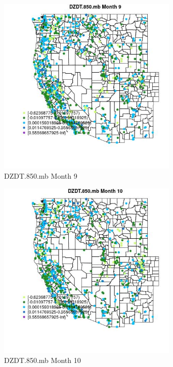 \begin{figure} 
\centering  
\includegraphics[width=0.77\textwidth]{Code_Outputs/Report_ML_input_PM25_Step4_part_f_de_duplicated_aves_prioritize_24hr_obswNAs_MapObsMo9DZDT850mb.jpg} 
\caption{\label{fig:Report_ML_input_PM25_Step4_part_f_de_duplicated_aves_prioritize_24hr_obswNAsMapObsMo9DZDT850mb}DZDT.850.mb Month 9} 
\end{figure} 
 

\begin{figure} 
\centering  
\includegraphics[width=0.77\textwidth]{Code_Outputs/Report_ML_input_PM25_Step4_part_f_de_duplicated_aves_prioritize_24hr_obswNAs_MapObsMo10DZDT850mb.jpg} 
\caption{\label{fig:Report_ML_input_PM25_Step4_part_f_de_duplicated_aves_prioritize_24hr_obswNAsMapObsMo10DZDT850mb}DZDT.850.mb Month 10} 
\end{figure} 
 

